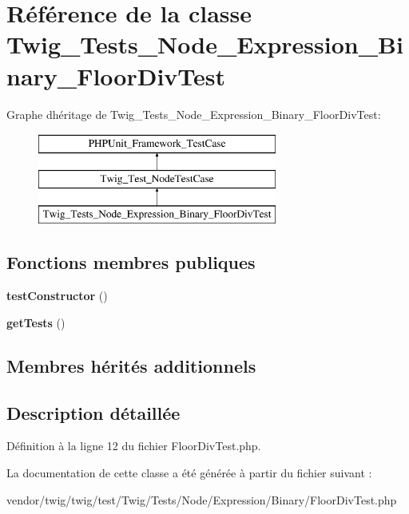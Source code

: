 \hypertarget{class_twig___tests___node___expression___binary___floor_div_test}{}\section{Référence de la classe Twig\+\_\+\+Tests\+\_\+\+Node\+\_\+\+Expression\+\_\+\+Binary\+\_\+\+Floor\+Div\+Test}
\label{class_twig___tests___node___expression___binary___floor_div_test}
Graphe d\textquotesingle{}héritage de Twig\+\_\+\+Tests\+\_\+\+Node\+\_\+\+Expression\+\_\+\+Binary\+\_\+\+Floor\+Div\+Test\+:\begin{figure}[H]
\begin{center}
\leavevmode
\includegraphics[height=3.000000cm]{class_twig___tests___node___expression___binary___floor_div_test}
\end{center}
\end{figure}
\subsection*{Fonctions membres publiques}
\begin{DoxyCompactItemize}
\item 
{\bfseries test\+Constructor} ()\hypertarget{class_twig___tests___node___expression___binary___floor_div_test_a47094dc941e72950570900d1418f89c6}{}\label{class_twig___tests___node___expression___binary___floor_div_test_a47094dc941e72950570900d1418f89c6}

\item 
{\bfseries get\+Tests} ()\hypertarget{class_twig___tests___node___expression___binary___floor_div_test_a7e247dd31cc8d37a6c97353a062a0080}{}\label{class_twig___tests___node___expression___binary___floor_div_test_a7e247dd31cc8d37a6c97353a062a0080}

\end{DoxyCompactItemize}
\subsection*{Membres hérités additionnels}


\subsection{Description détaillée}


Définition à la ligne 12 du fichier Floor\+Div\+Test.\+php.



La documentation de cette classe a été générée à partir du fichier suivant \+:\begin{DoxyCompactItemize}
\item 
vendor/twig/twig/test/\+Twig/\+Tests/\+Node/\+Expression/\+Binary/Floor\+Div\+Test.\+php\end{DoxyCompactItemize}
